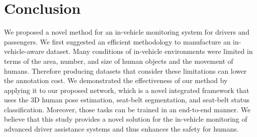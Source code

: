 \documentclass[letterpaper]{article} %
\begin{document}
\section{Conclusion}
We proposed a novel method for an in-vehicle monitoring system for drivers and passengers. We first suggested an efficient methodology to manufacture an in-vehicle-aware dataset. Many conditions of in-vehicle environments were limited in terms of the area, number, and size of human objects and the movement of humans. Therefore producing datasets that consider these limitations can lower the annotation cost. We demonstrated the effectiveness of our method by applying it to our proposed network, which is a novel integrated framework that uses the 3D human pose estimation, seat-belt segmentation, and seat-belt status classification. Moreover, those tasks can be trained in an end-to-end manner.
We believe that this study provides a novel solution for the in-vehicle monitoring of advanced driver assistance systems and thus enhances the safety for humans.

\end{document}
